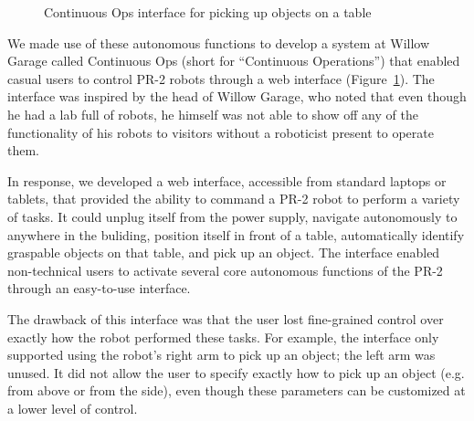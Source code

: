 \documentclass[10pt,twocolumn]{article}
\begin{document}
\begin{figure}[tbh]
\center{}
\caption{Continuous Ops interface for picking up objects on a table}
\label{contops}
\end{figure}

We made use of these autonomous functions to develop a system at Willow Garage called Continuous Ops (short for ``Continuous Operations'') that enabled casual users to control PR-2 robots through a web interface (Figure~\ref{contops}).
The interface was inspired by the head of Willow Garage, who noted that even though he had a lab full of robots, he himself was not able to show off any of the functionality of his robots to visitors without a roboticist present to operate them.

In response, we developed a web interface, accessible from standard laptops or tablets, that provided the ability to command a PR-2 robot to perform a variety of tasks.  It could unplug itself from the power supply, navigate autonomously to anywhere in the buliding, position itself in front of a table, automatically identify graspable objects on that table, and pick up an object.
The interface enabled non-technical users to activate several core autonomous functions of the PR-2 through an easy-to-use interface.

The drawback of this interface was that the user lost fine-grained control over exactly how the robot performed these tasks. For example, the interface only supported using the robot's right arm to pick up an object; the left arm was unused. It did not allow the user to specify exactly how to pick up an object (e.g. from above or from the side), even though these parameters can be customized at a lower level of control. 
\end{document}
